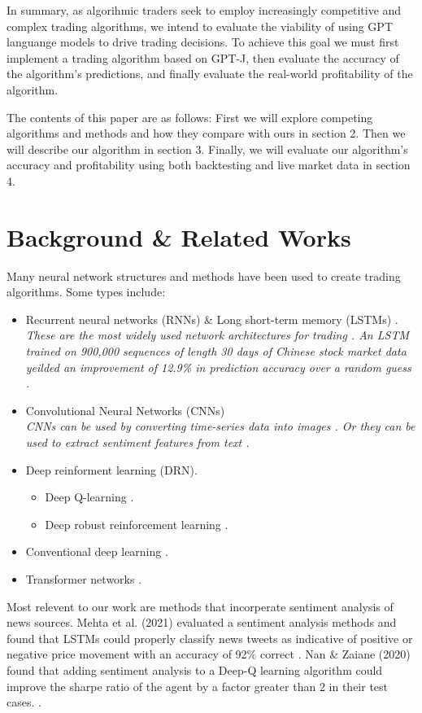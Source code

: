 \documentclass[conference]{IEEEtran}
\begin{document}
In summary, as algorihmic traders seek to employ increasingly competitive and complex trading algorithms, we intend to evaluate the viability of using GPT languange models to drive trading decisions. To achieve this goal we must first implement a trading algorithm based on GPT-J, then evaluate the accuracy of the algorithm's predictions, and finally evaluate the real-world profitability of the algorithm.

The contents of this paper are as follows: First we will explore competing algorithms and methods and how they compare with ours in section 2. Then we will describe our algorithm in section 3. Finally, we will evaluate our algorithm's accuracy and profitability using both backtesting and live market data in section 4. 

\section{Background \& Related Works}
Many neural network structures and methods have been used to create trading algorithms. Some types include: 
\begin{itemize}
    \item Recurrent neural networks (RNNs) \& Long short-term memory (LSTMs) \cite{Chen2017}\cite{Mehta2021}.
    \\\emph{These are the most widely used network architectures for trading \cite{Gu2020}. An LSTM trained on 900,000 sequences of length 30 days of Chinese stock market data yeilded an improvement of 12.9\% in prediction accuracy over a random guess \cite{Chen2015}.}
    \item Convolutional Neural Networks (CNNs) \cite{Gu2020}
    \\\emph{CNNs can be used by converting time-series data into images \cite{Sezer2018}. Or they can be used to extract sentiment features from text \cite{Shi2020}.}
    \item Deep reinforment learning (DRN).
    \begin{itemize}
        \item Deep Q-learning \cite{Wang2017} \cite{Nan2020}.
        \item Deep robust reinforcement learning \cite{Li2019}.
    \end{itemize}
    \item Conventional deep learning \cite{Day2016}.
    \item Transformer networks \cite{Schmitz2020}.
\end{itemize}
Most relevent to our work are methods that incorperate sentiment analysis of news sources. Mehta et al. (2021) evaluated a sentiment analysis methods and found that LSTMs could properly classify news tweets as indicative of positive or negative price movement with an accuracy of 92\% correct \cite{Mehta2021}. Nan \& Zaiane (2020) found that adding sentiment analysis to a Deep-Q learning algorithm could improve the sharpe ratio of the agent by a factor greater than 2 in their test cases. \cite{Nan2020}.
\end{document}
